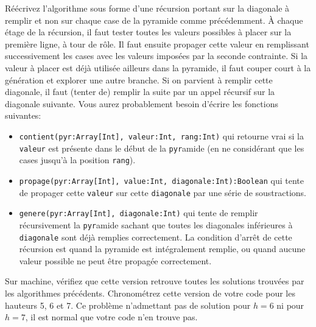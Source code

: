 \documentclass[10pt]{article}\usepackage[correction,nu]{esial}
\begin{document}
\Question %
Réécrivez l'algorithme sous forme d'une récursion portant sur la diagonale à
remplir et non sur chaque case de la pyramide comme précédemment. À chaque étage
de la récursion, il faut tester toutes les valeurs possibles à placer sur la
première ligne, à tour de rôle. Il faut ensuite propager cette valeur en
remplissant successivement les cases avec les valeurs imposées par la seconde
contrainte. Si la valeur à placer est déjà utilisée ailleurs dans la pyramide,
il faut couper court à la génération et explorer une autre branche. Si on
parvient à remplir cette diagonale, il faut (tenter de) remplir la suite par un
appel récursif sur la diagonale suivante. Vous aurez probablement besoin
d'écrire les fonctions suivantes:
\begin{itemize}
\item \texttt{contient(pyr:Array[Int], valeur:Int, rang:Int)} qui retourne vrai
  si la \texttt{valeur} est présente dans le début de la \texttt{pyr}amide
  (en ne considérant que les cases jusqu'à la position \texttt{rang}).
\item \texttt{propage(pyr:Array[Int], value:Int, diagonale:Int):Boolean} qui
  tente de propager cette \texttt{valeur} sur cette \texttt{diagonale} par une
  série de soustractions.
\item \texttt{genere(pyr:Array[Int], diagonale:Int)} qui tente de remplir
  récursivement la \texttt{pyr}amide sachant que toutes les diagonales
  inférieures à \texttt{diagonale} sont déjà remplies correctement. La condition
  d'arrêt de cette récursion est quand la pyramide est intégralement remplie, ou
  quand aucune valeur possible ne peut être propagée correctement.
\end{itemize}

\Question %
Sur machine, vérifiez que cette version retrouve toutes les solutions trouvées
par les algorithmes précédents. Chronométrez cette version de votre code pour
les hauteurs 5, 6 et 7. Ce problème n'admettant pas de solution pour $h=6$ ni
pour $h=7$, il est normal que votre code n'en trouve pas.
\end{document}
